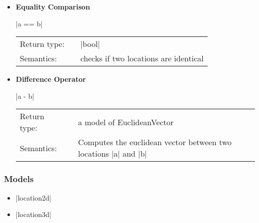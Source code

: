 \documentclass[12pt,twoside]{report}
\begin{document}
\begin{itemize}
\item {\bf Equality Comparison}

  |a == b|

  \begin{tabular}[!h]{l p{1cm} p{10cm}}
    Return type: & & |bool|\\
    Semantics: & & checks if two locations are identical\\
  \end{tabular}

\item {\bf Difference Operator}

  |a - b|

  \begin{tabular}[!h]{l p{1cm} p{10cm}}
    Return type: & & a model of EuclideanVector\\
    Semantics: & & Computes the euclidean vector between two locations |a| and |b| \\
  \end{tabular}


\end{itemize}


\htmlrule[CLEAR=all]  \subsubsection*{Models}
\begin{itemize}
\item |location2d|
\item |location3d|
\end{itemize}
\end{document}
